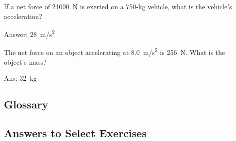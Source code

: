 \documentclass{article}
\begin{document}
\begin{exercise}
If a net force of \SI{21000}{N} is exerted on a 750-kg vehicle, what is the vehicle's acceleration?

{\color{red} Answer: \SI{28}{m/s^2}}

\end{exercise}

\begin{exercise}
    The net force on an object accelerating at \SI{8.0}{m/s^2} is \SI{256}{N}. What is the object's mass?

    {\color{red} Ans: \SI{32}{kg}}

\end{exercise}


\subsection{Glossary}



\clearpage

\subsection{Answers to Select Exercises}
\end{document}
